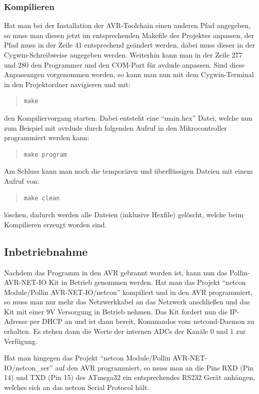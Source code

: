 \documentclass[a4paper,14pt,headsepline]{scrartcl}
\begin{document}
\subsubsection{Kompilieren}
Hat man bei der Installation der AVR-Toolchain einen anderen Pfad angegeben, so muss man diesen jetzt im entsprechenden Makefile des Projektes anpassen, der Pfad muss in der Zeile 41 entsprechend geändert werden, dabei muss dieser in der Cygwin-Schreibweise angegeben werden. Weiterhin kann man in der Zeile 277 und 280 den Programmer und den COM-Port für avdude anpassen. Sind diese Anpassungen vorgenommen worden, so kann man nun mit dem Cygwin-Terminal in den Projektordner navigieren und mit:
\begin{quote}
\begin{verbatim}
make
\end{verbatim}
\end{quote}
den Kompiliervorgang starten. Dabei entsteht eine "`main.hex"' Datei, welche nun zum Beispiel mit avrdude durch folgenden Aufruf in den Mikrocontroller programmiert werden kann:
\begin{quote}
\begin{verbatim}
make program
\end{verbatim}
\end{quote}
Am Schluss kann man noch die temporären und überflüssigen Dateien mit einem Aufruf von:
\begin{quote}
\begin{verbatim}
make clean
\end{verbatim}
\end{quote}
löschen, dadurch werden alle Dateien (inklusive Hexfile) gelöscht, welche beim Kompilieren erzeugt worden sind.

\subsection{Inbetriebnahme}
Nachdem das Programm in den AVR gebrannt worden ist, kann nun das Pollin-AVR-NET-IO Kit in Betrieb genommen werden. Hat man das Projekt "`netcon Module/Pollin AVR-NET-IO/netcon"' kompiliert und in den AVR programmiert, so muss man nur mehr das Netzwerkkabel an das Netzwerk anschließen und das Kit mit einer 9V Versorgung in Betrieb nehmen. Das Kit fordert nun die IP-Adresse per DHCP an und ist dann bereit, Kommandos vom netcond-Daemon zu erhalten. Es stehen dann die Werte der internen ADCs der Kanäle 0 und 1 zur  Verfügung.

Hat man hingegen das Projekt "`netcon Module/Pollin AVR-NET-IO/netcon\_ser"' auf den AVR programmiert, so muss man an die Pins RXD (Pin 14) und TXD (Pin 15) des ATmega32 ein entsprechendes RS232 Gerät anhängen, welches sich an das netcon Serial Protocol hält.
\end{document}

